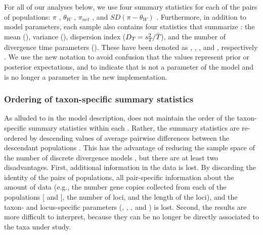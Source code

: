 For all of our analyses below, we use four summary statistics for each of
the pairs of populations:
$\pi$ \citep{Tajima1983}, $\theta_W$ \citep{Watterson1975}, $\pi_{net}$
\citep{Takahata1985}, and $SD(\pi-\theta_W)$ \citep{Tajima1989}.
Furthermore, in addition to model parameters, each sample \hpvector{}
also contains four statistics that summarize \divTimeMapVector:
the mean (\divTimeMean), variance (\divTimeVar), dispersion index
($D_{T_{}} = s^{2}_{T_{}}/\bar{T_{}}$), and the number
of divergence time parameters (\divTimeNum).
These have been denoted as \meant{}{}, \vart{}{}, \vmratio{}, and \numt{},
respectively \citep{Hickerson2006,Huang2011,Oaks2012}.
We use the new notation to avoid confusion that the values represent prior or
posterior expectations, and to indicate that \vmratio{} is not a parameter of
the model and \numt{} is no longer a parameter in the new implementation.

\subsubsection*{Ordering of taxon-specific summary statistics}
As alluded to in the model description, \msb does not maintain the order of the
taxon-specific summary statistics \alignmentSS{}{} within each \ssVector{}.
Rather, the summary statistics are re-ordered by descending values of average
pairwise differences between the descendant populations
\citep[$\pi_b$;][]{NeiLi1979,Huang2011}.
This has the advantage of reducing the sample space of the number of discrete
divergence models \divTimeIndexVector, but there are at least two disadvantages.
First, additional information in the data is lost.
By discarding the identity of the \npairs{} pairs of populations, all
pair-specific information about the amount of data (e.g., the number gene
copies collected from each of the populations [ and
], the number of loci, and the length of the loci), and the
taxon- and locus-specific parameters (\hkyModel{}{},
\mutationRateScalarConstant{}{}, \ploidyScalar{}{}, and
\locusMutationRateScalar{}) is lost.
Second, the results are more difficult to interpret, because they can be no
longer be directly associated to the taxa under study.

